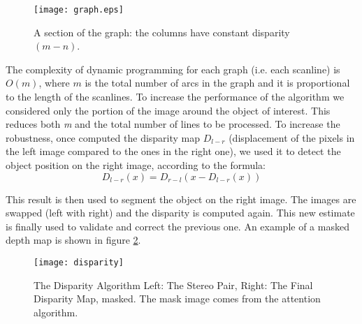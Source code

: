 \begin{figure}
	\centering
		\texttt{[image: graph.eps]}
	\caption{A section of the graph: the columns have constant disparity $(m-n)$.}
	\label{fig-graph}
\end{figure}

The complexity of dynamic programming for each graph (i.e. each scanline) is $O(m)$, where $m$ is the total number of arcs in the graph and it is proportional to the length of the scanlines. To increase the performance of the algorithm we considered only the portion of the image around the object of interest. 
This reduces both {\em m} and the total number of lines to be processed. To increase the robustness, once computed the disparity map $D_{l-r}$ (displacement of the pixels in the left image compared to the ones in the right one), we used it to detect the object position on the right image, according to the formula: 
\begin{equation}D_{l-r}(x)=D_{r-l}(x-D_{l-r}(x))\end{equation}

This result is then used to segment the object on the right image. The images are swapped (left with right) and the disparity is computed again. This new estimate is finally used to validate and correct the previous one. An example of a masked depth map is shown in figure \ref{fig-disparity}.

\begin{figure}
\centering
\texttt{[image: disparity]}
\caption{The Disparity Algorithm  Left: The Stereo Pair, Right: The Final Disparity Map, masked. The mask image comes from the attention algorithm.}
\label{fig-disparity}
\end{figure}

